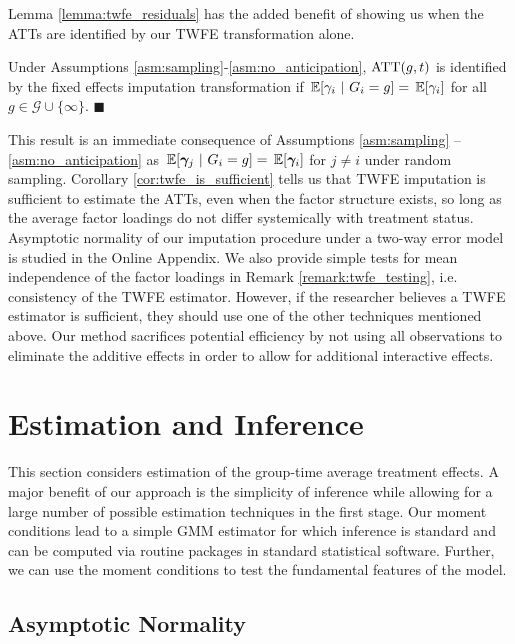 Lemma \ref{lemma:twfe_residuals} has the added benefit of showing us when the ATTs are identified by our TWFE transformation alone.
\begin{corollary}\label{cor:twfe_is_sufficient}
  Under Assumptions \ref{asm:sampling}-\ref{asm:no_anticipation}, $\text{ATT}(g,t)$ is identified by the fixed effects imputation transformation if $\expec{\gamma_i}{G_i=g} = \expec{\gamma_i}$ for all $g \in \mathcal{G} \cup \{\infty\}$. $\blacksquare$
\end{corollary}
This result is an immediate consequence of Assumptions \ref{asm:sampling} -- \ref{asm:no_anticipation} as $\expec{\bm \gamma_j}{G_i = g} = \expec{\bm \gamma_i}$ for $j \neq i$ under random sampling. 
Corollary \ref{cor:twfe_is_sufficient} tells us that TWFE imputation is sufficient to estimate the ATTs, even when the factor structure exists, so long as the average factor loadings do not differ systemically with treatment status. Asymptotic normality of our imputation procedure under a two-way error model is studied in the Online Appendix. We also provide simple tests for mean independence of the factor loadings in Remark \ref{remark:twfe_testing}, i.e. consistency of the TWFE estimator. However, if the researcher believes a TWFE estimator is sufficient, they should use one of the other techniques mentioned above. Our method sacrifices potential efficiency by not using all observations to eliminate the additive effects in order to allow for additional interactive effects.



\section{Estimation and Inference}\label{sec:estimation}

This section considers estimation of the group-time average treatment effects. A major benefit of our approach is the simplicity of inference while allowing for a large number of possible estimation techniques in the first stage. Our moment conditions lead to a simple GMM estimator for which inference is standard and can be computed via routine packages in standard statistical software. Further, we can use the moment conditions to test the fundamental features of the model.

\subsection{Asymptotic Normality}

